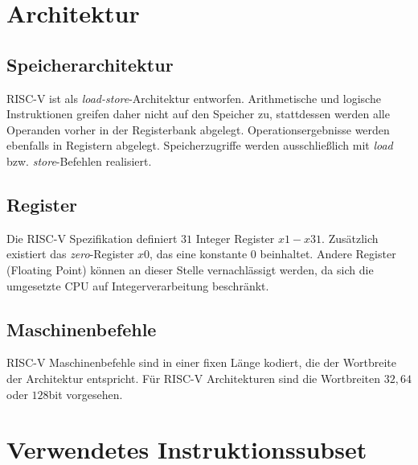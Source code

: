 

\section{Architektur}

\subsection{Speicherarchitektur}
RISC-V ist als \textit{load-store}-Architektur entworfen. Arithmetische und logische Instruktionen greifen daher nicht auf den Speicher zu, stattdessen werden alle Operanden vorher in der Registerbank abgelegt. Operationsergebnisse werden ebenfalls in Registern abgelegt. Speicherzugriffe werden ausschließlich mit \textit{load} bzw. \textit{store}-Befehlen realisiert.

\subsection{Register} \label{subsec:Register}
Die RISC-V Spezifikation definiert $31$ Integer Register $x1 - x31$. Zusätzlich existiert das \textit{zero}-Register $x0$, das eine konstante $0$ beinhaltet. Andere Register (Floating Point) können an dieser Stelle vernachlässigt werden, da sich die umgesetzte CPU auf Integerverarbeitung beschränkt.

\subsection{Maschinenbefehle}
RISC-V Maschinenbefehle sind in einer fixen Länge kodiert, die der Wortbreite der Architektur entspricht. Für RISC-V Architekturen sind die Wortbreiten $32, 64$ oder $128$bit vorgesehen.

\section{Verwendetes Instruktionssubset}

